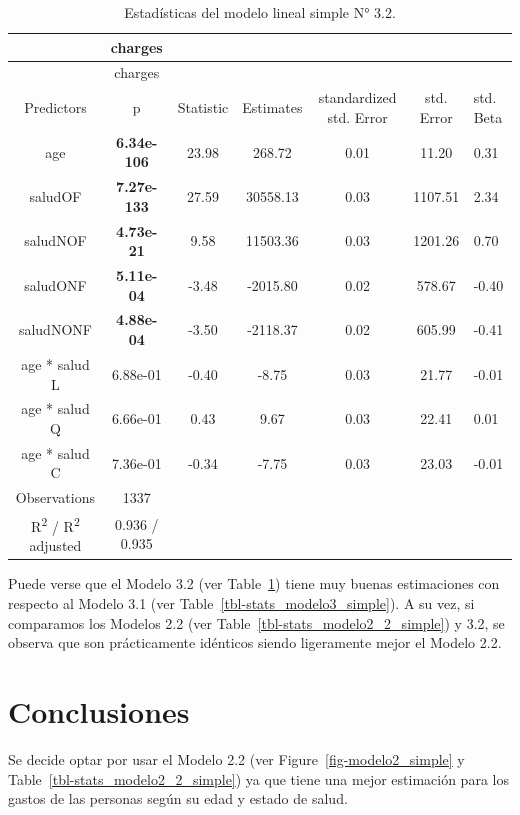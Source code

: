 \documentclass[
  letterpaper,
]{book}
\begin{document}
\hypertarget{tbl-stats_modelo3_2_simple}{}
\begin{longtable}[]{@{}ccccccl@{}}
\caption{\label{tbl-stats_modelo3_2_simple}Estadísticas del modelo
lineal simple N° 3.2.}\tabularnewline
\toprule()
~ & charges & & & & & \\
\midrule()
\endfirsthead
\toprule()
~ & charges & & & & & \\
\midrule()
\endhead
Predictors & p & Statistic & Estimates & standardized std. Error & std.
Error & std. Beta \\
age & \textbf{6.34e-106} & 23.98 & 268.72 & 0.01 & 11.20 & 0.31 \\
saludOF & \textbf{7.27e-133} & 27.59 & 30558.13 & 0.03 & 1107.51 &
2.34 \\
saludNOF & \textbf{4.73e-21} & 9.58 & 11503.36 & 0.03 & 1201.26 &
0.70 \\
saludONF & \textbf{5.11e-04} & -3.48 & -2015.80 & 0.02 & 578.67 &
-0.40 \\
saludNONF & \textbf{4.88e-04} & -3.50 & -2118.37 & 0.02 & 605.99 &
-0.41 \\
age * salud L & 6.88e-01 & -0.40 & -8.75 & 0.03 & 21.77 & -0.01 \\
age * salud Q & 6.66e-01 & 0.43 & 9.67 & 0.03 & 22.41 & 0.01 \\
age * salud C & 7.36e-01 & -0.34 & -7.75 & 0.03 & 23.03 & -0.01 \\
Observations & 1337 & & & & & \\
R\textsuperscript{2} / R\textsuperscript{2} adjusted & 0.936 / 0.935 & &
& & & \\
\bottomrule()
\end{longtable}

Puede verse que el Modelo 3.2 (ver
Table~\ref{tbl-stats_modelo3_2_simple}) tiene muy buenas estimaciones
con respecto al Modelo 3.1 (ver Table~\ref{tbl-stats_modelo3_simple}). A
su vez, si comparamos los Modelos 2.2 (ver
Table~\ref{tbl-stats_modelo2_2_simple}) y 3.2, se observa que son
prácticamente idénticos siendo ligeramente mejor el Modelo 2.2.

\hypertarget{conclusiones}{%
\section*{Conclusiones}\label{conclusiones}}

Se decide optar por usar el Modelo 2.2 (ver
Figure~\ref{fig-modelo2_simple} y
Table~\ref{tbl-stats_modelo2_2_simple}) ya que tiene una mejor
estimación para los gastos de las personas según su edad y estado de
salud.


\backmatter
\end{document}
